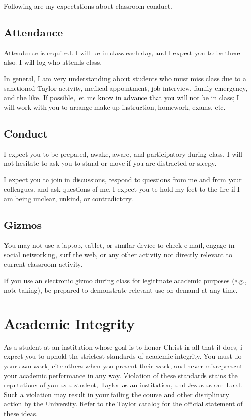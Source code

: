 \documentclass{article}
\begin{document}
Following are my expectations about classroom conduct.

\subsection{Attendance}
\label{sec:orgheadline10}

Attendance is required. I will be in class each day, and I expect you to be there also. I
will log who attends class.

In general, I am very understanding about students who must miss class due to a sanctioned
Taylor activity, medical appointment, job interview, family emergency, and the like. If
possible, let me know in advance that you will not be in class; I will work with you to
arrange make-up instruction, homework, exams, etc.

\subsection{Conduct}
\label{sec:orgheadline11}

I expect you to be prepared, awake, aware, and participatory during class. I will not
hesitate to ask you to stand or move if you are distracted or sleepy.

I expect you to join in discussions, respond to questions from me and from your
colleagues, and ask questions of me. I expect you to hold my feet to the fire if I am
being unclear, unkind, or contradictory.

\subsection{Gizmos}
\label{sec:orgheadline12}

You may not use a laptop, tablet, or similar device to check e-mail, engage in social
networking, surf the web, or any other activity not directly relevant to current classroom
activity.

If you use an electronic gizmo during class for legitimate academic purposes (e.g., note
taking), be prepared to demonstrate relevant use on demand at any time.

\section{Academic Integrity}
\label{sec:orgheadline16}

As a student at an institution whose goal is to honor Christ in all that it does, i expect
you to uphold the strictest standards of academic integrity. You must do your own work,
cite others when you present their work, and never misrepresent your academic performance
in any way. Violation of these standards stains the reputations of you as a student,
Taylor as an institution, and Jesus as our Lord. Such a violation may result in your
failing the course and other disciplinary action by the University. Refer to the Taylor
catalog for the official statement of these ideas.
\end{document}
